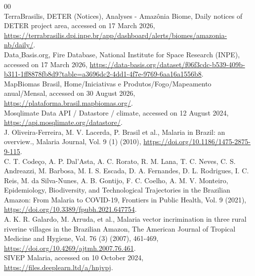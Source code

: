 \documentclass[a4paper,fleqn]{cas-dc}
\begin{document}
\begin{thebibliography}{00}
\\
 TerraBrasilis, DETER (Notices), Analyses - Amazônia Biome, Daily notices of DETER project area, accessed on 17 March 2026, \href{https://terrabrasilis.dpi.inpe.br/app/dashboard/alerts/biomes/amazonia-nb/daily/}{https://terrabrasilis.dpi.inpe.br/app/dashboard/alerts/biomes/amazonia-nb/daily/}.
\\
 Data$\_$Basis.org, Fire Database, National Institute for Space Research (INPE), accessed on 17 March 2026, \href{https://data-basis.org/dataset/f06f3cdc-b539-409b-b311-1ff8878fb8d9?table=a3696dc2-4dd1-4f7e-9769-6aa16a1556b8}{https://data-basis.org/dataset/f06f3cdc-b539-409b-b311-1ff8878fb8d9?table=a3696dc2-4dd1-4f7e-9769-6aa16a1556b8}.
\\
 MapBiomas Brasil, Home/Iniciativas e Produtos/Fogo/Mapeamento anual/Mensal, accessed on 30 August 2026, \href{https://plataforma.brasil.mapbiomas.org/}{https://plataforma.brasil.mapbiomas.org/}.
\\
 Mosqlimate Data API / Datastore / climate, accessed on 12 August 2024, \href{https://api.mosqlimate.org/datastore/}{https://api.mosqlimate.org/datastore/}.
\\
 J. Oliveira-Ferreira, M. V. Lacerda, P. Brasil et al., Malaria in Brazil: an overview., Malaria Journal, Vol. 9 (1) (2010), \href{https://doi.org/10.1186/1475-2875-9-115}{https://doi.org/10.1186/1475-2875-9-115}.
\\
 C. T. Codeço, A. P. Dal'Asta, A. C. Rorato, R. M. Lana, T. C. Neves, C. S. Andreazzi, M. Barbosa, M. I. S. Escada, D. A. Fernandes, D. L. Rodrigues, I. C. Reis, M. da Silva-Nunes, A. B. Gontijo, F. C. Coelho, A. M. V. Monteiro, Epidemiology, Biodiversity, and Technological Trajectories in the Brazilian Amazon: From Malaria to COVID-19, Frontiers in Public Health, Vol. 9 (2021), \href{https://doi.org/10.3389/fpubh.2021.647754}{https://doi.org/10.3389/fpubh.2021.647754}.
\\
 A. K. R. Galardo, M. Arruda, et al., Malaria vector incrimination in three rural riverine villages in the Brazilian Amazon, The American Journal of Tropical Medicine and Hygiene, Vol. 76 (3) (2007), 461-469, \href{https://doi.org/10.4269/ajtmh.2007.76.461}{https://doi.org/10.4269/ajtmh.2007.76.461}.
\\
 SIVEP Malaria, accessed on 10 October 2024, \href{https://files.deeplearn.ltd/a/hnjvpj}{https://files.deeplearn.ltd/a/hnjvpj}.

\end{thebibliography}
\end{document}
